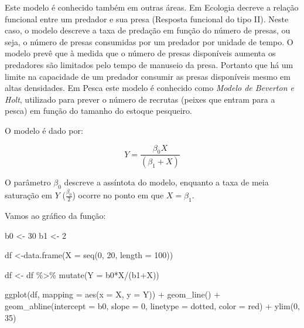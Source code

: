 \documentclass[
]{book}
\newenvironment{Shaded}{\begin{snugshade}}{\end{snugshade}}
\newcommand{\AttributeTok}[1]{\textcolor[rgb]{0.77,0.63,0.00}{#1}}
\newcommand{\DecValTok}[1]{\textcolor[rgb]{0.00,0.00,0.81}{#1}}
\newcommand{\FunctionTok}[1]{\textcolor[rgb]{0.00,0.00,0.00}{#1}}
\newcommand{\NormalTok}[1]{#1}
\newcommand{\OtherTok}[1]{\textcolor[rgb]{0.56,0.35,0.01}{#1}}
\newcommand{\SpecialCharTok}[1]{\textcolor[rgb]{0.00,0.00,0.00}{#1}}
\newcommand{\StringTok}[1]{\textcolor[rgb]{0.31,0.60,0.02}{#1}}
\begin{document}
Este modelo é conhecido também em outras áreas. Em Ecologia decreve a relação funcional entre um predador e sua presa (Resposta funcional do tipo II). Neste caso, o modelo descreve a taxa de predação em função do número de presas, ou seja, o número de presas consumidas por um predador por unidade de tempo. O modelo prevê que à medida que o número de presas disponíveis aumenta os predadores são limitados pelo tempo de manuseio da presa. Portanto que há um limite na capacidade de um predador consumir as presas disponíveis mesmo em altas densidades. Em Pesca este modelo é conhecido como \emph{Modelo de Beverton e Holt}, utilizado para prever o número de recrutas (peixes que entram para a pesca) em função do tamanho do estoque pesqueiro.

O modelo é dado por:

\[Y = \frac{\beta_0 X}{(\beta_1 + X)}\]

O parâmetro \(\beta_0\) descreve a assíntota do modelo, enquanto a taxa de meia saturação em \(Y\) (\(\frac{\beta_0}{2}\)) ocorre no ponto em que \(X = \beta_1\).

Vamos ao gráfico da função:

\begin{Shaded}
\begin{Highlighting}[]
\NormalTok{b0 }\OtherTok{\textless{}{-}} \DecValTok{30}
\NormalTok{b1 }\OtherTok{\textless{}{-}} \DecValTok{2}

\NormalTok{df }\OtherTok{\textless{}{-}}\FunctionTok{data.frame}\NormalTok{(}\AttributeTok{X =} \FunctionTok{seq}\NormalTok{(}\DecValTok{0}\NormalTok{, }\DecValTok{20}\NormalTok{, }\AttributeTok{length =} \DecValTok{100}\NormalTok{))}

\NormalTok{df }\OtherTok{\textless{}{-}}\NormalTok{ df }\SpecialCharTok{\%\textgreater{}\%} \FunctionTok{mutate}\NormalTok{(}\AttributeTok{Y =}\NormalTok{ b0}\SpecialCharTok{*}\NormalTok{X}\SpecialCharTok{/}\NormalTok{(b1}\SpecialCharTok{+}\NormalTok{X))}

\FunctionTok{ggplot}\NormalTok{(df, }\AttributeTok{mapping =} \FunctionTok{aes}\NormalTok{(}\AttributeTok{x =}\NormalTok{ X, }\AttributeTok{y =}\NormalTok{ Y)) }\SpecialCharTok{+}
  \FunctionTok{geom\_line}\NormalTok{() }\SpecialCharTok{+}
  \FunctionTok{geom\_abline}\NormalTok{(}\AttributeTok{intercept =}\NormalTok{ b0, }\AttributeTok{slope =} \DecValTok{0}\NormalTok{, }\AttributeTok{linetype =} \StringTok{\textquotesingle{}dotted\textquotesingle{}}\NormalTok{, }\AttributeTok{color =} \StringTok{\textquotesingle{}red\textquotesingle{}}\NormalTok{) }\SpecialCharTok{+}
  \FunctionTok{ylim}\NormalTok{(}\DecValTok{0}\NormalTok{, }\DecValTok{35}\NormalTok{)}
\end{Highlighting}
\end{Shaded}
\end{document}
